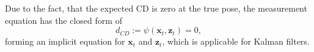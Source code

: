 Due to the fact, that the expected CD is zero at the true pose,
the measurement equation has the closed form of
\begin{equation}\label{eq:implicit-meas-eq}
    d_{CD} :=\psi(\mathbf{x}_t,\mathbf{z}_t) = 0,
\end{equation}
forming an implicit equation for $\mathbf{x}_t$ and $\mathbf{z}_t$, which is
applicable for Kalman filters.
